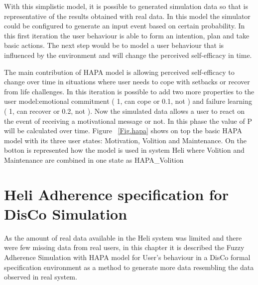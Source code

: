 \documentclass{llncs}
\begin{document}
With this simplistic model, it is possible to generated simulation data so that is representative of the results obtained with real data. In this model the simulator could be configured to generate an input event based on certain probability. In this first iteration the user behaviour is able to form an intention, plan and take basic actions. The next step would be to model a user behaviour that is influenced by the environment and will change the perceived self-efficacy in time.

The main contribution of HAPA model is allowing perceived self-efficacy to change over time in situations where user needs to cope with setbacks or recover from life challenges. In this iteration is possible to add two more properties to the user model:emotional commitment ( 1, can cope or 0.1, not ) and failure learning ( 1, can recover or 0.2, not ). Now the simulated data allows a user to react on the event of receiving a motivational message or not. In this phase the value of P will be calculated over time.
Figure ~\ref{Fig.hapa} shows on top the basic HAPA model with its three user states: Motivation, Volition and Maintenance. On the botton is represented how the model is used in system Heli where Volition and Maintenance are combined in one state as HAPA\_Volition

\section {Heli Adherence specification for DisCo Simulation}
\label{sec.helimodel}

As the amount of real data available in the Heli system was limited and there were few missing data from real users, in this chapter it is described the Fuzzy Adherence Simulation with HAPA model for User's behaviour in a DisCo formal specification environment as a method to generate more data resembling the data observed in real system.
\end{document}
